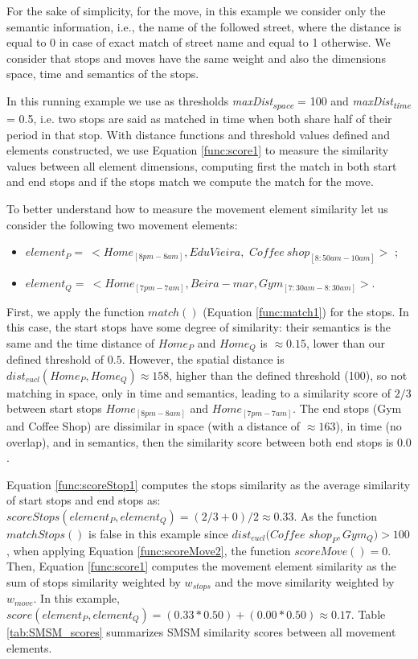 \documentclass[12pt]{article}
\begin{document}
For the sake of simplicity, for the move, in this example we consider only the semantic information, i.e., the name of the followed street, where the distance is equal to 0 in case of exact match of street name and equal to 1 otherwise.
We consider that stops and moves have the same weight and also the dimensions space, time and semantics of the stops.

In this running example we use as thresholds \textit{maxDist\textsubscript{space}} = 100  and \textit{maxDist\textsubscript{time}} = 0.5, i.e. two stops are said as matched in time when both share half of their period in that stop.
With distance functions and threshold values defined and elements constructed, we use Equation \ref{func:score1} to measure the similarity values between all element dimensions, computing first the match in both start and end stops and if the stops match we compute the match for the move. 

To better understand how to measure the movement element similarity let us consider  the following two movement elements: 
\begin{itemize}

\item $element_{P}=\ <Home_{[8pm-8am]}, Edu Vieira,$ $Coffee\ shop_{[8:50am-10am]}>$ ;
\item $element_{Q}=\ <Home_{[7pm-7am]}, Beira-mar, Gym_{[7:30am-8:30am]}>$. 
\end{itemize}
First, we apply the function $match()$ (Equation \ref{func:match1}) for the stops. In this case, the start stops have some degree of similarity: their semantics is the same and the time distance of $Home_{P}$ and $Home_{Q}$ is $\approx 0.15$, lower than our defined threshold of $0.5$. However, the spatial distance is $dist_{eucl}(Home_{P}, Home_{Q}) \approx 158 $, higher than the defined threshold (100), so not matching in space, only in time and semantics, leading to a similarity score of $2/3$ between start stops $Home_{[8pm-8am]}$ and $Home_{[7pm-7am]}$. The end stops (Gym and Coffee Shop) are dissimilar in space (with a distance of $\approx 163$), in time (no overlap), and in semantics, then the similarity score between both end stops is $0.0$.

 Equation \ref{func:scoreStop1} computes the stops similarity as the average similarity of start stops  and end stops as: $scoreStops(element_{P}, element_{Q}) = (2/3 + 0) / 2 \approx 0.33$.
 As the function $matchStops()$ is false in this example since $dist_{eucl}(Coffee$ $shop_{P}, Gym_{Q}) > 100$, when applying Equation \ref{func:scoreMove2}, the function %
$scoreMove()=0$. Then, Equation \ref{func:score1} computes the movement element similarity as the sum of stops similarity weighted by $w_{stops}$ and the move similarity weighted by $w_{move}$. In this example, $score(element_{P}, element_{Q}) = (0.33 * 0.50) + (0.00 * 0.50) \approx 0.17$. Table \ref{tab:SMSM_scores} summarizes SMSM similarity scores between all movement elements.
\end{document}
